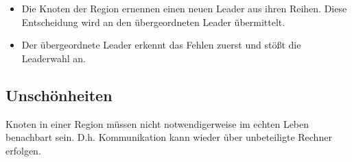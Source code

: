 \begin{itemize}
\item Die Knoten der Region ernennen einen neuen Leader aus ihren Reihen. Diese Entscheidung wird an den übergeordneten Leader übermittelt.
\item Der übergeordnete Leader erkennt das Fehlen zuerst und stößt die Leaderwahl an.
\end{itemize}

\subsection{Unschönheiten}
Knoten in einer Region müssen nicht notwendigerweise im echten Leben benachbart sein. D.h. Kommunikation kann wieder über unbeteiligte Rechner erfolgen.

